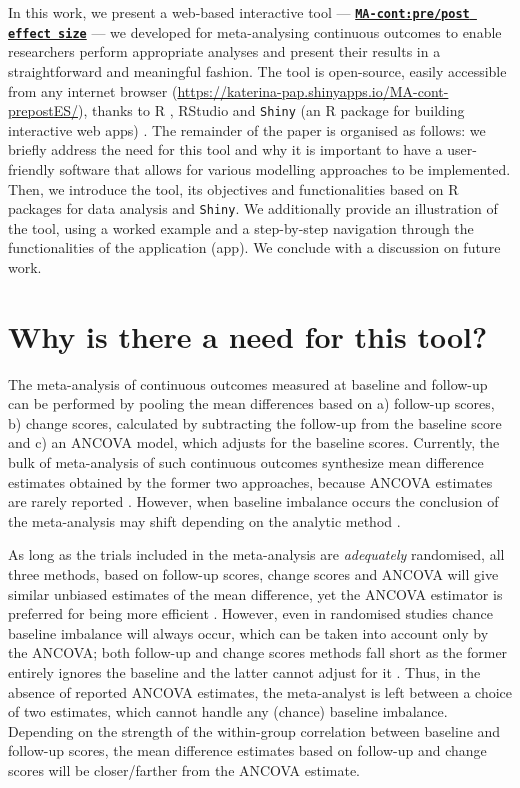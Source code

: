 \documentclass[AMA,STIX1COL]{WileyNJD-v2}
\begin{document}
In this work, we present a web-based interactive tool — \href{https://katerina-pap.shinyapps.io/MA-cont-prepostES/}{\textbf{\texttt{MA-cont:pre/post effect size}}} — we developed for meta-analysing continuous outcomes to enable researchers perform appropriate analyses and present their results in a straightforward and meaningful fashion. The tool is open-source, easily accessible from any internet browser (\url{https://katerina-pap.shinyapps.io/MA-cont-prepostES/}), thanks to R \citep{RCoreTeam2020}, RStudio \citep{Rstudiocite} and \texttt{Shiny} (an R package for building interactive web apps) \citep{chang2017shiny}. The remainder of the paper is organised as follows: we briefly address the need for this tool and why it is important to have a user-friendly software that allows for various modelling approaches to be implemented. Then, we introduce the tool, its objectives and functionalities based on R packages for data analysis and \texttt{Shiny}. We additionally provide an illustration of the tool, using a worked example and a step-by-step navigation through the functionalities of the application (app). We conclude with a discussion on future work.

\section{Why is there a need for this tool?}

The meta-analysis of continuous outcomes measured at baseline and follow-up can be performed by pooling the mean differences based on a) follow-up scores, b) change scores, calculated by subtracting the follow-up from the baseline score and c) an ANCOVA model, which adjusts for the baseline scores. Currently, the bulk of meta-analysis of such continuous outcomes synthesize mean difference estimates obtained by the former two approaches, because ANCOVA estimates are rarely reported \citep{austin2010substantial}. However, when baseline imbalance occurs the conclusion of the meta-analysis may shift depending on the analytic method \citep{fu2016change}.

As long as the trials included in the meta-analysis are \textit{adequately} randomised, all three methods, based on follow-up scores, change scores and ANCOVA will give similar unbiased estimates of the mean difference, yet the ANCOVA estimator is preferred for being more efficient \citep{senn2006change, fu2013handling, senn2013seven, senn2014baseline}. However, even in randomised studies chance baseline imbalance will always occur, which can be taken into account only by the ANCOVA; both follow-up and change scores methods fall short as the former entirely ignores the baseline and the latter cannot adjust for it \citep{vickers2001analysing}. Thus, in the absence of reported ANCOVA estimates, the meta-analyst is left between a choice of two estimates, which cannot handle any (chance) baseline imbalance. Depending on the strength of the within-group correlation between baseline and follow-up scores, the mean difference estimates based on follow-up and change scores will be closer/farther from the ANCOVA estimate.
\end{document}
